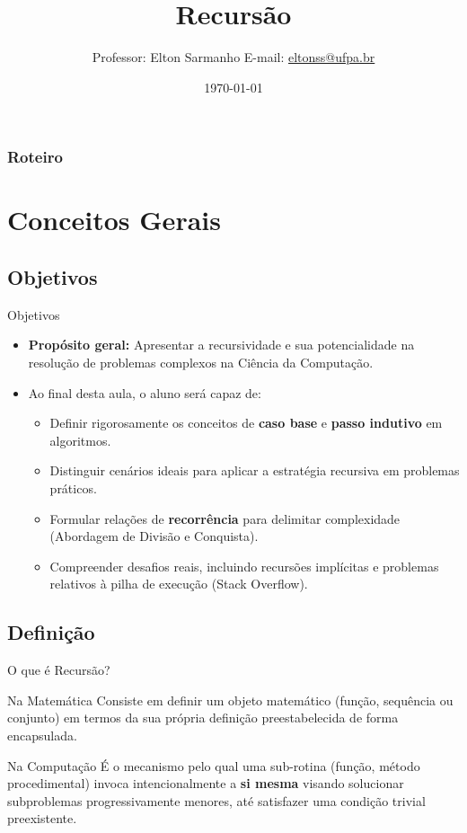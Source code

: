 \documentclass{beamer}
\title[Estrutura de Dados I]{Recursão}
\author[Elton Sarmanho]{ 
Professor: Elton Sarmanho\inst{1} 
\newline
E-mail: \href{mailto:eltonss@ufpa.br}{eltonss@ufpa.br}\newline
\href{https://github.com/eltonsarmanho}{\faGithub} \href{https://www.linkedin.com/in/elton-sarmanho-836553185/}{\faLinkedinSquare}
}
\institute[UFPA]{
   \inst{1}%
     Faculdade de Sistemas de Informação - UFPA/CUTINS
}
\date{\today}
\begin{document}
\begin{frame}
\titlepage
\end{frame}

\begin{frame}
\frametitle{Roteiro}
\tableofcontents[sections={1-2}]
\end{frame}

\section{Conceitos Gerais}
\subsection{Objetivos}
\begin{frame}{Objetivos}
\begin{itemize}
    \item \textbf{Propósito geral:} Apresentar a recursividade e sua potencialidade na resolução de problemas complexos na Ciência da Computação.
    \pause
    \item Ao final desta aula, o aluno será capaz de:
    \begin{itemize}
        \item Definir rigorosamente os conceitos de \textbf{caso base} e \textbf{passo indutivo} em algoritmos.
        \pause
        \item Distinguir cenários ideais para aplicar a estratégia recursiva em problemas práticos.
        \pause
        \item Formular relações de \textbf{recorrência} para delimitar complexidade (Abordagem de Divisão e Conquista).
        \pause
        \item Compreender desafios reais, incluindo recursões implícitas e problemas relativos à pilha de execução (Stack Overflow).
    \end{itemize}
\end{itemize}
\end{frame}

\subsection{Definição}
\begin{frame}{O que é Recursão?}
\begin{block}{Na Matemática}
    Consiste em definir um objeto matemático (função, sequência ou conjunto) em termos da sua própria definição preestabelecida de forma encapsulada.
\end{block}
\pause
\begin{block}{Na Computação}
    É o mecanismo pelo qual uma sub-rotina (função, método procedimental) invoca intencionalmente a \textbf{si mesma} visando solucionar subproblemas progressivamente menores, até satisfazer uma condição trivial preexistente.
\end{block}
\pause
\vspace{0.3cm}

\end{frame}
\end{document}
